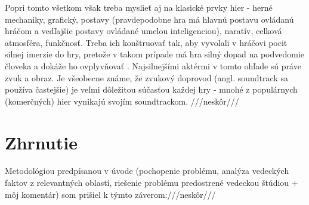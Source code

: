 \documentclass[10pt,twoside,slovak,a4paper]{article}
\begin{document}
Popri tomto všetkom však treba myslieť aj na klasické prvky hier - herné mechaniky, grafický, postavy (pravdepodobne hra má hlavnú postavu ovládanú hráčom a vedľajšie postavy ovládané umelou inteligenciou), naratív, celková atmosféra, funkčnosť. Treba ich konštruovať tak, aby vyvolali v hráčovi pocit silnej imerzie do hry, pretože v takom prípade má hra silný dopad na podvedomie človeka a dokáže ho ovplyvňovať \cite{an2015subconscious}. Najsilnejšími aktérmi v tomto ohľade sú práve zvuk a obraz. Je všeobecne známe, že zvukový doprovod (angl. soundtrack sa používa častejšie) je veľmi dôležitou súčasťou každej hry - mnohé z populárnych (komerčných) hier vynikajú svojím soundtrackom. ///neskôr///

\section{Zhrnutie} \label{zaver}
Metodológiou predpísanou v úvode (pochopenie problému, analýza vedeckých faktov z relevantných oblastí, riešenie problému predostrené vedeckou štúdiou + môj komentár) som prišiel k týmto záverom:///neskôr///

 

\end{document}
